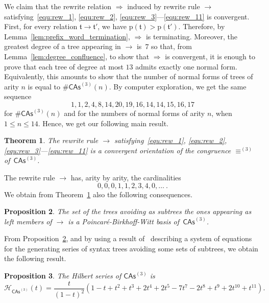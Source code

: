 \documentclass[10pt,reqno]{amsart}
\numberwithin{equation}{subsection}
\newtheorem{Theorem}{Theorem}[subsection]
\newtheorem{Proposition}[Theorem]{Proposition}
\renewcommand{\leq}{\leqslant}
\newcommand{\Tfr}{\mathfrak{t}}
\newcommand{\HilbertSeries}{\mathcal{H}}
\newcommand{\CAs}[1]{\mathsf{CAs}^{(#1)}}
\newcommand{\PrefixWord}{\mathrm{p}}
\DeclareMathOperator{\Congr}{\equiv}
\DeclareMathOperator{\Rew}{\to}
\DeclareMathOperator{\RewContext}{\Rightarrow}
\newcommand{\CongrCAs}[1]{\Congr^{(#1)}}
\begin{document}
\noindent
We claim that the rewrite relation $\RewContext$ induced by
rewrite rule $\Rew$ satisfying~\eqref{equ:rew_1}, \eqref{equ:rew_2}, 
\eqref{equ:rew_3}---\eqref{equ:rew_11} is convergent. First, for every 
relation $\Tfr \Rew \Tfr'$, we have
$\PrefixWord(\Tfr) > \PrefixWord(\Tfr')$. Therefore, by
Lemma~\ref{lem:prefix_word_termination}, $\RewContext$ is terminating.
Moreover, the greatest degree of a tree appearing in $\Rew$ is~$7$ so
that, from Lemma~\ref{lem:degree_confluence}, to show that $\RewContext$
is convergent, it is enough to prove that each tree of degree at most
$13$ admits exactly one normal form. Equivalently, this amounts to
show that the number of normal forms of trees of arity $n$ is equal
to $\#\CAs{3}(n)$. By computer exploration, we get the same sequence
\begin{equation} \label{equ:dimensions_CAs_3}
    1, 1, 2, 4, 8, 14, 20, 19, 16, 14, 14, 15, 16, 17
\end{equation}
for $\#\CAs{3}(n)$ and for the numbers of normal forms of arity $n$,
when $ 1 \leq n \leq 14$. Hence, we get our following main result.

\begin{Theorem} \label{thm:convergent_rewrite_rule_CAs_3}
    The rewrite rule $\Rew$ satisfying~\eqref{equ:rew_1},
    \eqref{equ:rew_2}, \eqref{equ:rew_3}---\eqref{equ:rew_11} is a
    convergent orientation of the congruence $\CongrCAs{3}$
    of~$\CAs{3}$.
\end{Theorem}

The rewrite rule $\Rew$ has, arity by arity, the cardinalities
\begin{equation}
    0, 0, 0, 1, 1, 2, 3, 4, 0, \dots~.
\end{equation}
We obtain from Theorem~\ref{thm:convergent_rewrite_rule_CAs_3} also
the following consequences.

\begin{Proposition} \label{prop:PBW_basis_CAs_3}
    The set of the trees avoiding as subtrees the ones appearing as
    left members of $\Rew$ is a Poincaré-Birkhoff-Witt basis
    of~$\CAs{3}$.
\end{Proposition}

From Proposition~\ref{prop:PBW_basis_CAs_3}, and by using a result
of~\cite{Gir18} describing a system of equations for the generating
series of syntax trees avoiding some sets of subtrees, we obtain the
following result.

\begin{Proposition} \label{prop:Hilbert_series_CAs_3}
    The Hilbert series of $\CAs{3}$ is
    \begin{equation} \label{equ:Hilbert_series_CAs_3}
        \HilbertSeries_{\CAs{3}}(t) = \frac{t}{(1 - t)^2}
        \left(1 - t + t^2 + t^3 + 2t^4 + 2t^5 - 7t^7 - 2t^8 + t^9 +
        2t^{10} + t^{11}\right).
    \end{equation}
\end{Proposition}
\end{document}
